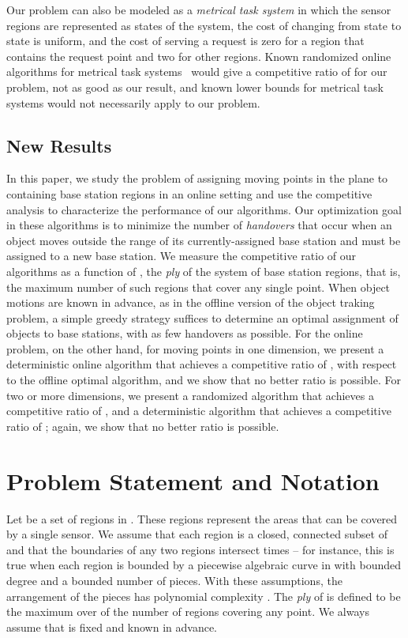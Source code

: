 \documentclass[runningheads]{llncs}
\begin{document}
Our problem can also be modeled as a \emph{metrical task system} in which the sensor regions are represented as states of the system, the cost of changing from state to state is uniform, and the cost of serving a request is zero for a region that contains the request point and two for other regions. Known randomized online algorithms for metrical task systems~\cite{IraSei-TCS-98} would give a competitive ratio of  for our problem, not as good as our  result, and known lower bounds for metrical task systems would not necessarily apply to our problem.

\subsection{New Results}
In this paper,
we study the problem of assigning moving points 
in the plane to containing base station regions in an online
setting and use the competitive analysis to characterize the
performance of our algorithms.  
Our optimization goal in these algorithms 
is to minimize the number of \emph{handovers} that occur when 
an object moves outside the range of its currently-assigned base 
station and must be assigned to a new base station. 
We measure the competitive ratio of 
our algorithms as a function of , the \emph{ply} of 
the system of base station regions, 
that is, the maximum number of such regions
that cover any single point. 
When object motions are known in advance, 
as in the offline version of the object traking problem, 
a simple greedy strategy 
suffices to determine an optimal assignment of objects to base stations, 
with as few handovers as possible. 
For the online problem, on the other hand,
for moving points in one dimension, we present a deterministic online 
algorithm that achieves a competitive ratio of , 
with respect to the offline optimal algorithm,
and we show that no better ratio is possible. 
For two or more dimensions, we present a randomized algorithm 
that achieves a competitive ratio of , 
and a deterministic algorithm that achieves a competitive 
ratio of ; again, we show that no better ratio is possible.

\section {Problem Statement and Notation} \label {sec:prelims}

Let  be a set of  regions in . These regions represent the areas that can be covered by a single sensor. We assume that each region is a closed, connected subset of  and that the boundaries of any two regions intersect  times -- for instance, this is true when each region is bounded by a piecewise algebraic curve in  with bounded degree and a bounded number of pieces. With these assumptions, the arrangement of the pieces has polynomial complexity . The \emph {ply} of  is defined to be the maximum over  of the number of regions covering any point.  We always assume that  is fixed and known in advance.
\end{document}

